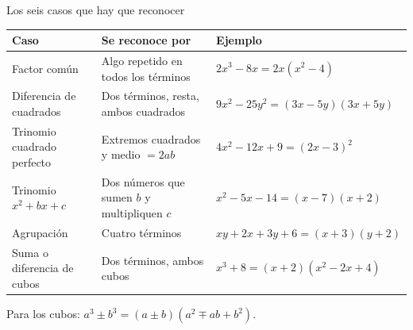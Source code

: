 \documentclass[aspectratio=169,10pt]{beamer}
\begin{document}
\begin{frame}{Los seis casos que hay que reconocer}
  \scriptsize
  \begin{center}
  \begin{tabular}{@{}p{3.4cm}p{4.0cm}p{4.6cm}@{}}
    \toprule
    \textbf{Caso} & \textbf{Se reconoce por} & \textbf{Ejemplo} \\
    \midrule
    Factor común &
      Algo repetido en todos los términos &
      $2x^{3}-8x = 2x(x^{2}-4)$ \\
    \addlinespace
    Diferencia de cuadrados &
      Dos términos, resta, ambos cuadrados &
      $9x^{2}-25y^{2} = (3x-5y)(3x+5y)$ \\
    \addlinespace
    Trinomio cuadrado perfecto &
      Extremos cuadrados y medio $=2ab$ &
      $4x^{2}-12x+9 = (2x-3)^{2}$ \\
    \addlinespace
    Trinomio $x^{2}+bx+c$ &
      Dos números que sumen $b$ y multipliquen $c$ &
      $x^{2}-5x-14 = (x-7)(x+2)$ \\
    \addlinespace
    Agrupación &
      Cuatro términos &
      $xy+2x+3y+6 = (x+3)(y+2)$ \\
    \addlinespace
    Suma o diferencia de cubos &
      Dos términos, ambos cubos &
      $x^{3}+8 = (x+2)(x^{2}-2x+4)$ \\
    \bottomrule
  \end{tabular}
  \end{center}

  \vspace{0.05cm}
  {\tiny\color{uniGris} Para los cubos:
  $a^{3}\pm b^{3} = (a\pm b)(a^{2}\mp ab+b^{2})$. }
\end{frame}
\end{document}
